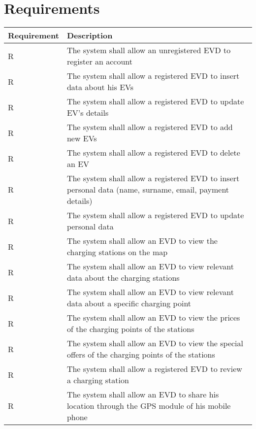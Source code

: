 \section{Requirements}
\setcounter{r}{1}
\newcommand{\rcount}{\ther\stepcounter{r}}
\begin{center}
    \begin{longtable}[H]{|p{0.2\linewidth}|p{0.8\linewidth}|}
     \hline
     \textbf{Requirement} & \textbf{Description}\\
     \hline
     R\rcount & The system shall allow an unregistered EVD to register an account\\
     \hline
     R\rcount & The system shall allow a registered EVD to insert data about his EVs \\
     \hline
     R\rcount & The system shall allow a registered EVD to update EV's details\\
     \hline
     R\rcount & The system shall allow a registered EVD to add new EVs \\
     \hline
     R\rcount & The system shall allow a registered EVD to delete an EV\\
     \hline
     R\rcount & The system shall allow a registered EVD to insert personal data (name, surname, email, payment details)\\
     \hline
     R\rcount & The system shall allow a registered EVD to update personal data\\
     \hline
     R\rcount & The system shall allow an EVD to view the charging stations on the map\\
     \hline
     R\rcount & The system shall allow an EVD to view relevant data about the charging stations\\
     \hline
     R\rcount & The system shall allow an EVD to view relevant data about a specific charging point\\
     \hline
     R\rcount & The system shall allow an EVD to view the prices of the charging points of the stations\\
     \hline
     R\rcount & The system shall allow an EVD to view the special offers of the charging points of the stations\\
     \hline
     R\rcount & The system shall allow a registered EVD to review a charging station \\
     \hline
     R\rcount & The system shall allow an EVD to share his location through the GPS module of his mobile phone\\

\end{longtable}
\end{center}
